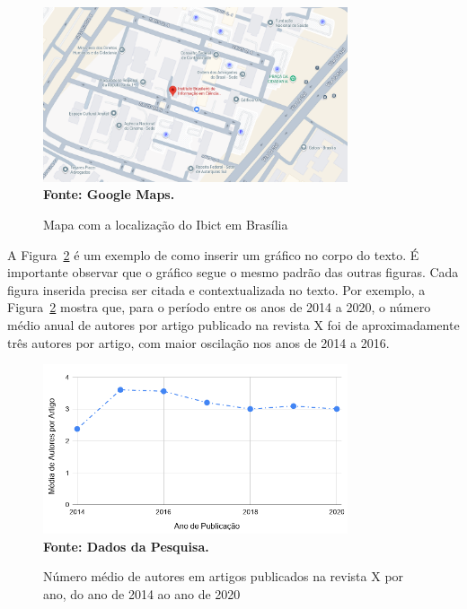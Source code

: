 \documentclass[a4paper,12pt]{article}
\begin{document}
	\begin{figure}[ht]
		\centering	
		\caption[Mapa com a localização do Ibict.]{Mapa com a localização do Ibict em Brasília}
		\label{fig:figura2}
		\includegraphics[width=0.8\textwidth]{figuras/mapa-ibict}\\
		\textbf{\footnotesize Fonte: Google Maps.}
	\end{figure}
	
	A Figura~\ref{fig:figura3} é um exemplo de como inserir um gráfico no corpo do texto. É importante observar que o gráfico segue o mesmo padrão das outras figuras. Cada figura inserida precisa ser citada e contextualizada no texto. Por exemplo, a Figura~\ref{fig:figura3} mostra que, para o período entre os anos de 2014 a 2020, o número médio anual de autores por artigo publicado na revista X foi de aproximadamente três autores por artigo, com maior oscilação nos anos de 2014 a 2016.
	
	\begin{figure}[ht]
		\centering	
		\caption[Média de Autores por Artigo.]{Número médio de autores em artigos publicados na revista X por ano, do ano de 2014 ao ano de 2020}
		\label{fig:figura3}
		\includegraphics[width=0.8\textwidth]{figuras/AutoresPorArtigoNaRevistaAbakos.png}\\
		\textbf{\footnotesize Fonte: Dados da Pesquisa.}
	\end{figure}
	
\end{document}
